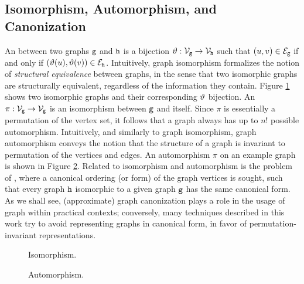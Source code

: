 \subsection{Isomorphism, Automorphism, and Canonization} \label{sec:isomorphisms}
An  between two graphs $\mathtt{g}$ and $\mathtt{h}$ is a bijection $\Isomorph: \Nodes{g}\rightarrow \Nodes{h}$ such that $(u,v) \in \Edges{g}$ if and only if $(\Isomorph(u),\Isomorph(v)) \in \Edges{h}$. Intuitively, graph isomorphism formalizes the notion of \emph{structural equivalence} between graphs, in the sense that two isomorphic graphs are structurally equivalent, regardless of the information they contain. Figure \ref{fig:isomorphism} shows two isomorphic graphs and their corresponding $\vartheta$ bijection. An  $\pi: \Nodes{g}\rightarrow \Nodes{g}$ is an isomorphism between $\mathtt{g}$ and itself. Since $\pi$ is essentially a permutation of the vertex set, it follows that a graph always has up to $n!$ possible automorphism. Intuitively, and similarly to graph isomorphism, graph automorphism conveys the notion that the structure of a graph is invariant to permutation of the vertices and edges. An automorphism $\pi$ on an example graph is shown
in Figure \ref{fig:automorphism}. Related to isomorphism and automorphism is the problem of , where a canonical ordering (or form) of the graph vertices is sought, such that every graph $\mathtt{h}$ isomorphic to a given graph $\mathtt{g}$ has the same canonical form. As we shall see, (approximate) graph canonization plays a role in the usage of graph within practical contexts; conversely, many techniques described in this work try to avoid representing graphs in canonical form, in favor of permutation-invariant representations.

\begin{figure*}
    \begin{subfigure}[b]{0.48\linewidth}
        \centering
        \resizebox{.9\textwidth}{!}{}
        \caption{Isomorphism.}
        \label{fig:isomorphism}
    \end{subfigure}
    \begin{subfigure}[b]{0.48\linewidth}
        \centering
        \resizebox{.9\textwidth}{!}{}
        \caption{Automorphism.}
        \label{fig:automorphism}
    \end{subfigure}
    \caption{An example of graph isomorphism and automorphism.}
\end{figure*}


